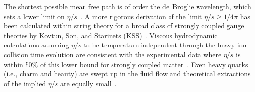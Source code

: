 The shortest possible mean
free path is of order the de~Broglie wavelength, which sets a lower
limit on $\eta/s$~\cite{Danielewicz:1984ww}.  A more rigorous
derivation of the limit $\eta/s \ge 1/4\pi$ has been calculated
within string theory for a broad class of strongly coupled gauge
theories by Kovtun, Son, and Starinets (KSS)~\cite{Kovtun:2004de}.
Viscous hydrodynamic calculations assuming $\eta/s$ to be temperature
independent through the heavy ion collision time evolution are
consistent with the experimental data where $\eta/s$ is within 50\% of
this lower bound for strongly coupled
matter~\cite{Luzum:2008cw,Song:2007ux,Alver:2010dn,Teaney:2009qa,Schenke:2011zz,Adare:2011tg}.
Even heavy quarks (i.e., charm and beauty) are swept up in the fluid
flow and theoretical extractions of the implied $\eta/s$ are equally
small~\cite{Adare:2006nq}.




